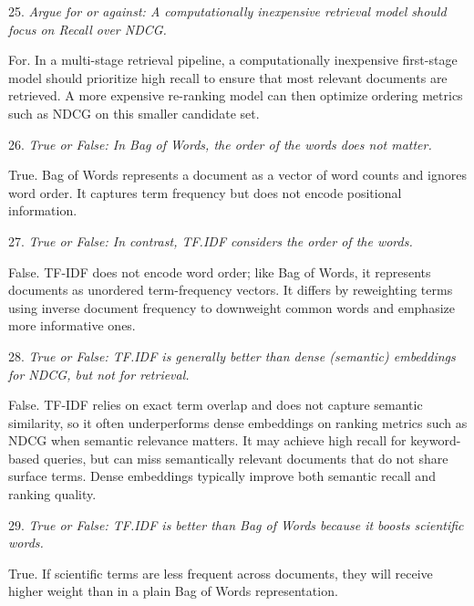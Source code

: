 \vspace{1cm}

25. \textit{Argue for or against: A computationally inexpensive retrieval model should focus on Recall over NDCG.}

For. In a multi-stage retrieval pipeline, a computationally inexpensive first-stage model should prioritize high recall to ensure that most relevant documents are retrieved. A more expensive re-ranking model can then optimize ordering metrics such as NDCG on this smaller candidate set.

\vspace{1cm}

26. \textit{True or False: In Bag of Words, the order of the words does not matter.}

True. Bag of Words represents a document as a vector of word counts and ignores word order. It captures term frequency but does not encode positional information.

\vspace{1cm}

27. \textit{True or False: In contrast, TF.IDF considers the order of the words.}

False. TF-IDF does not encode word order; like Bag of Words, it represents documents as unordered term-frequency vectors. It differs by reweighting terms using inverse document frequency to downweight common words and emphasize more informative ones.

\vspace{1cm}

28. \textit{True or False: TF.IDF is generally better than dense (semantic) embeddings for NDCG, but not for retrieval.}

False. TF-IDF relies on exact term overlap and does not capture semantic similarity, so it often underperforms dense embeddings on ranking metrics such as NDCG when semantic relevance matters. It may achieve high recall for keyword-based queries, but can miss semantically relevant documents that do not share surface terms. Dense embeddings typically improve both semantic recall and ranking quality.

\vspace{1cm}

29. \textit{True or False: TF.IDF is better than Bag of Words because it boosts scientific words.}

True. If scientific terms are less frequent across documents, they will receive higher weight than in a plain Bag of Words representation.

